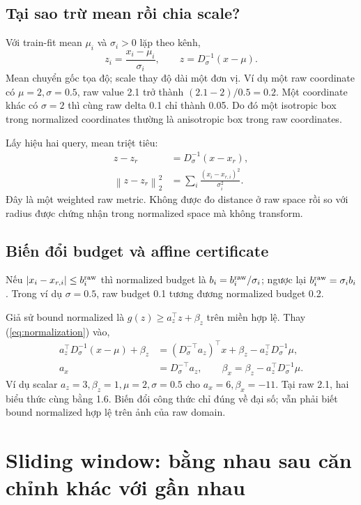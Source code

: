 \documentclass[11pt,a4paper]{article}
\newcommand{\norm}[1]{\left\lVert#1\right\rVert}
\theoremstyle{definition}
\begin{document}
\subsection{Tại sao trừ mean rồi chia scale?}
Với train-fit mean $\mu_i$ và $\sigma_i>0$ lặp theo kênh,
\begin{equation}
z_i=\frac{x_i-\mu_i}{\sigma_i},\qquad
z=D_\sigma^{-1}(x-\mu).
\label{eq:normalization}
\end{equation}
Mean chuyển gốc tọa độ; scale thay độ dài một đơn vị. Ví dụ một raw coordinate
có $\mu=2,\sigma=0.5$, raw value 2.1 trở thành $(2.1-2)/0.5=0.2$.
Một coordinate khác có $\sigma=2$ thì cùng raw delta 0.1 chỉ thành 0.05.
Do đó một isotropic box trong normalized coordinates thường là anisotropic
box trong raw coordinates.

Lấy hiệu hai query, mean triệt tiêu:
\begin{align}
z-z_r&=D_\sigma^{-1}(x-x_r),\\
\norm{z-z_r}_2^2&=\sum_i\frac{(x_i-x_{r,i})^2}{\sigma_i^2}.
\end{align}
Đây là một weighted raw metric. Không được đo distance ở raw space rồi
so với radius được chứng nhận trong normalized space mà không transform.

\subsection{Biến đổi budget và affine certificate}
Nếu $|x_i-x_{r,i}|\le b_i^{\rm raw}$ thì normalized budget là
$b_i=b_i^{\rm raw}/\sigma_i$; ngược lại $b_i^{\rm raw}=\sigma_i b_i$.
Trong ví dụ $\sigma=0.5$, raw budget 0.1 tương đương normalized budget 0.2.

Giả sử bound normalized là $g(z)\ge a_z^\top z+\beta_z$ trên miền hợp lệ.
Thay (\ref{eq:normalization}) vào,
\begin{align}
a_z^\top D_\sigma^{-1}(x-\mu)+\beta_z
&=(D_\sigma^{-\top}a_z)^\top x
+\beta_z-a_z^\top D_\sigma^{-1}\mu,\\
a_x&=D_\sigma^{-\top}a_z,\qquad
\beta_x=\beta_z-a_z^\top D_\sigma^{-1}\mu.
\end{align}
Ví dụ scalar $a_z=3,\beta_z=1,\mu=2,\sigma=0.5$ cho $a_x=6,\beta_x=-11$.
Tại raw 2.1, hai biểu thức cùng bằng 1.6. Biến đổi công thức chỉ đúng về
đại số; vẫn phải biết bound normalized hợp lệ trên ảnh của raw domain.

\section{Sliding window: bằng nhau sau căn chỉnh khác với gần nhau}
\end{document}
